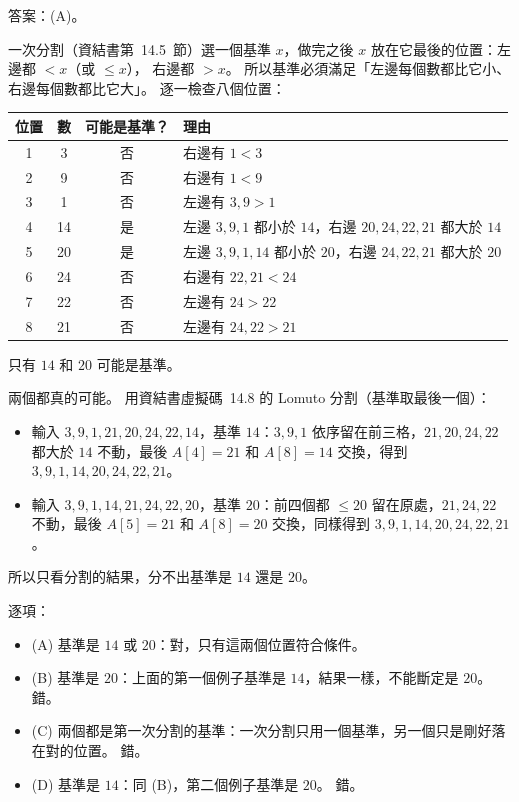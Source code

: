 \begin{pastsoln}
答案：(A)。

一次分割（資結書第~14.5~節）選一個基準 $x$，做完之後 $x$ 放在它最後的位置：左邊都 $< x$（或 $\le x$），
右邊都 $> x$。 所以基準必須滿足「左邊每個數都比它小、右邊每個數都比它大」。 逐一檢查八個位置：
\begin{center}
\small
\begin{tabular}{cccl}
\toprule
位置 & 數 & 可能是基準？ & 理由 \\
\midrule
1 & 3 & 否 & 右邊有 $1 < 3$ \\
2 & 9 & 否 & 右邊有 $1 < 9$ \\
3 & 1 & 否 & 左邊有 $3, 9 > 1$ \\
4 & 14 & 是 & 左邊 $3, 9, 1$ 都小於 $14$，右邊 $20, 24, 22, 21$ 都大於 $14$ \\
5 & 20 & 是 & 左邊 $3, 9, 1, 14$ 都小於 $20$，右邊 $24, 22, 21$ 都大於 $20$ \\
6 & 24 & 否 & 右邊有 $22, 21 < 24$ \\
7 & 22 & 否 & 左邊有 $24 > 22$ \\
8 & 21 & 否 & 左邊有 $24, 22 > 21$ \\
\bottomrule
\end{tabular}
\end{center}
只有 $14$ 和 $20$ 可能是基準。

兩個都真的可能。 用資結書虛擬碼~14.8 的 Lomuto 分割（基準取最後一個）：
\begin{itemize}
\item 輸入 $3, 9, 1, 21, 20, 24, 22, 14$，基準 $14$：$3, 9, 1$ 依序留在前三格，$21, 20, 24, 22$ 都大於
$14$ 不動，最後 $A[4] = 21$ 和 $A[8] = 14$ 交換，得到 $3, 9, 1, 14, 20, 24, 22, 21$。
\item 輸入 $3, 9, 1, 14, 21, 24, 22, 20$，基準 $20$：前四個都 $\le 20$ 留在原處，$21, 24, 22$ 不動，最後
$A[5] = 21$ 和 $A[8] = 20$ 交換，同樣得到 $3, 9, 1, 14, 20, 24, 22, 21$。
\end{itemize}
所以只看分割的結果，分不出基準是 $14$ 還是 $20$。

逐項：
\begin{itemize}
\item (A) 基準是 $14$ 或 $20$：對，只有這兩個位置符合條件。
\item (B) 基準是 $20$：上面的第一個例子基準是 $14$，結果一樣，不能斷定是 $20$。 錯。
\item (C) 兩個都是第一次分割的基準：一次分割只用一個基準，另一個只是剛好落在對的位置。 錯。
\item (D) 基準是 $14$：同 (B)，第二個例子基準是 $20$。 錯。
\end{itemize}
\end{pastsoln}
